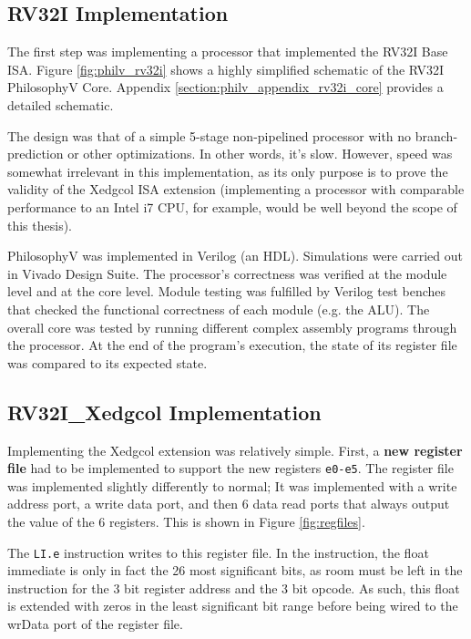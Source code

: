    \subsection{RV32I Implementation}
        The first step was implementing a processor that implemented the RV32I Base ISA. Figure \ref{fig:philv_rv32i} shows a highly simplified schematic of the RV32I PhilosophyV Core. Appendix \ref{section:philv_appendix_rv32i_core} provides a detailed schematic.

        

        The design was that of a simple 5-stage non-pipelined processor with no branch-prediction or other optimizations. In other words, it's slow. However, speed was somewhat irrelevant in this implementation, as its only purpose is to prove the validity of the Xedgcol ISA extension (implementing a processor with comparable performance to an Intel i7 CPU, for example, would be well beyond the scope of this thesis).

        PhilosophyV was implemented in Verilog (an \gls{HDL}). Simulations were carried out in Vivado Design Suite. The processor's  correctness was verified at the module level and at the core level. Module testing was fulfilled by Verilog test benches that checked the functional correctness of each module (e.g. the ALU). The overall core was tested by running different complex assembly programs through the processor. At the end of the program's execution, the state of its register file was compared to its expected state.

    \subsection{RV32I\_Xedgcol Implementation}
        

        Implementing the Xedgcol extension was relatively simple. First, a \textbf{new register file} had to be implemented to support the new registers \texttt{e0-e5}. The register file was implemented slightly differently to normal; It was implemented with a write address port, a write data port, and then 6 data read ports that always output the value of the 6 registers. This is shown in Figure \ref{fig:regfiles}.

        
        
        The \texttt{LI.e} instruction writes to this register file. In the instruction, the float immediate is only in fact the 26 most significant bits, as room must be left in the instruction for the 3 bit register address and the 3 bit opcode. As such, this float is extended with zeros in the least significant bit range before being wired to the wrData port of the register file. 
        
